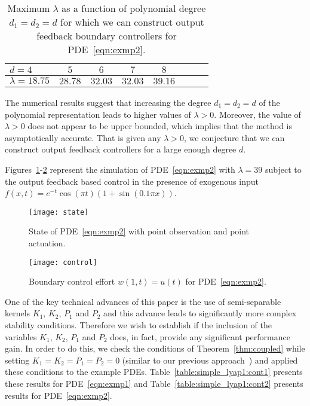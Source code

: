 \documentclass[US letter, 9 pt, conference]{ieeeconf}  \usepackage{setspace}
\begin{document}
\begin{table}{}
\caption{Maximum $\lambda$ as a function of polynomial degree $d_1=d_2=d$ for which we can construct output feedback boundary controllers for PDE~\eqref{eqn:exmp2}.}
\vspace{-10pt}
\begin{center}
    \begin{tabular}{l *{7}{c}}\hline
  $d=4$ & $5$ & $6$ & $7$ & $8$  \\ \hline
  $\lambda=18.75$ & $28.78$ & $32.03$ & $32.03$ & $39.16$
\end{tabular}
\end{center}
\label{table:exmp2:cont}
\end{table}

The numerical results suggest that increasing the degree $d_1=d_2=d$ of the polynomial representation leads to higher values of $\lambda>0$. Moreover, the value of $\lambda>0$ does not appear to be upper bounded, which implies that the method is asymptotically accurate. That is given any $\lambda>0$, we conjecture that we can construct output feedback controllers for a large enough degree $d$.

Figures~\ref{fig:1}-\ref{fig:2} represent the simulation of PDE~\eqref{eqn:exmp2} with $\lambda=39$ subject to the output feedback based control in the presence of exogenous input $f(x,t)=e^{-t}\cos(\pi t)\left(1+\sin(0.1 \pi x)\right)$.
\begin{figure}[h!]
\vspace{-10pt}
    \centering
    \texttt{[image: state]}
    \vspace{-5pt}
\caption{State of PDE~\eqref{eqn:exmp2} with point observation and point actuation.}
\label{fig:1}
\end{figure}
\begin{figure}[h!]
\vspace{-10pt}
    \centering
    \texttt{[image: control]}
    \vspace{-5pt}
\caption{Boundary control effort $w(1,t)=u(t)$ for PDE~\eqref{eqn:exmp2}.}
\label{fig:2}
\end{figure}

One of the key technical advances of this paper is the use of semi-separable kernels $K_1$, $K_2$, $P_1$ and $P_2$ and this advance leads to significantly more complex stability conditions. Therefore we wish to establish if the inclusion of the variables $K_1$, $K_2$, $P_1$ and $P_2$ does, in fact, provide any significant performance gain. In order to do this, we check the conditions of Theorem~\ref{thm:coupled} while setting $K_1=K_2=P_1=P_2=0$ (similar to our previous approach~\cite{gahlawat2011designing}) and applied these conditions to the example PDEs.  Table~\ref{table:simple_lyap1:cont1} presents these results for PDE~\eqref{eqn:exmp1} and Table~\ref{table:simple_lyap1:cont2} presents results for PDE~\eqref{eqn:exmp2}.
\end{document}
